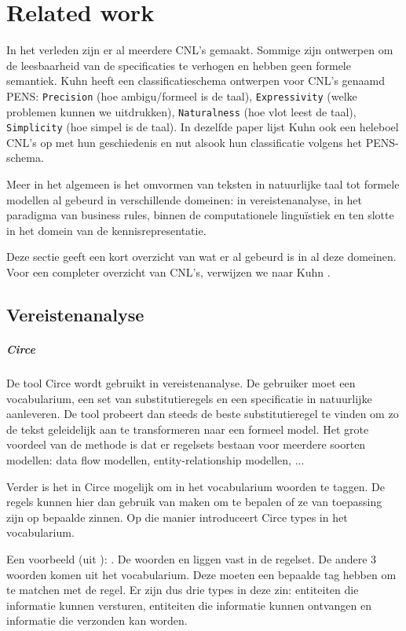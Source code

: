 \chapter{Related work}
In het verleden zijn er al meerdere CNL's gemaakt. Sommige zijn ontwerpen om de leesbaarheid van de specificaties te verhogen en hebben geen formele semantiek. Kuhn \cite{Kuhn2014} heeft een classificatieschema ontwerpen voor CNL's genaamd PENS: \texttt{Precision} (hoe ambigu/formeel is de taal), \texttt{Expressivity} (welke problemen kunnen we uitdrukken), \texttt{Naturalness} (hoe vlot leest de taal), \texttt{Simplicity} (hoe simpel is de taal). In dezelfde paper lijst Kuhn ook een heleboel CNL's op met hun geschiedenis en nut alsook hun classificatie volgens het PENS-schema.

Meer in het algemeen is het omvormen van teksten in natuurlijke taal tot formele modellen al gebeurd in verschillende domeinen: in vereistenanalyse, in het paradigma van business rules, binnen de computationele lingu\"istiek en ten slotte in het domein van de kennisrepresentatie.

Deze sectie geeft een kort overzicht van wat er al gebeurd is in al deze domeinen. Voor een completer overzicht van CNL's, verwijzen we naar Kuhn \cite{Kuhn2014}.

\section{Vereistenanalyse}
\paragraph{Circe} De tool Circe \cite{Ambriola1997} wordt gebruikt in vereistenanalyse. De gebruiker moet een vocabularium, een set van substitutieregels en een specificatie in natuurlijke aanleveren. De tool probeert dan steeds de beste substitutieregel te vinden om zo de tekst geleidelijk aan te transformeren naar een formeel model. Het grote voordeel van de methode is dat er regelsets bestaan voor meerdere soorten modellen: data flow modellen, entity-relationship modellen, ...

Verder is het in Circe mogelijk om in het vocabularium woorden te taggen. De regels kunnen hier dan gebruik van maken om te bepalen of ze van toepassing zijn op bepaalde zinnen. Op die manier introduceert Circe types in het vocabularium.

Een voorbeeld (uit \cite{Ambriola1997}): . De woorden  en  liggen vast in de regelset. De andere 3 woorden komen uit het vocabularium. Deze moeten een bepaalde tag hebben om te matchen met de regel. Er zijn dus drie types in deze zin: entiteiten die informatie kunnen versturen, entiteiten die informatie kunnen ontvangen en informatie die verzonden kan worden.

